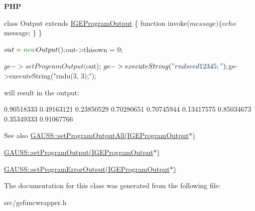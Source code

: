 {\bfseries P\+HP} 
\begin{DoxyCode}
\textcolor{keyword}{class }Output \textcolor{keyword}{extends} \hyperlink{class_i_g_e_program_output}{IGEProgramOutput} \{
    \textcolor{keyword}{function} invoke($message) \{
        echo $message;
    \}
\}

$out = \textcolor{keyword}{new} Output();
$out->thisown = 0;

$ge->setProgramOutput($out);
$ge->executeString(\textcolor{stringliteral}{"rndseed 12345;"});
$ge->executeString(\textcolor{stringliteral}{"rndu(3, 3);"});
\end{DoxyCode}


will result in the output\+: 
\begin{DoxyCode}
0.90518333       0.49163121       0.23850529
0.70280651       0.70745944       0.13417575
0.85034673       0.35349333       0.91067766
\end{DoxyCode}


\begin{DoxySeeAlso}{See also}
\hyperlink{class_g_a_u_s_s_a0b8379c48d677e05aeab433dba66fbb6}{G\+A\+U\+S\+S\+::set\+Program\+Output\+All(\+I\+G\+E\+Program\+Output$\ast$)} 

\hyperlink{class_g_a_u_s_s_a7f0dc6b5b307aa06c347f9c6a9fdacab}{G\+A\+U\+S\+S\+::set\+Program\+Output(\+I\+G\+E\+Program\+Output$\ast$)} 

\hyperlink{class_g_a_u_s_s_abd75266b2c4075da75163fe95b013ef3}{G\+A\+U\+S\+S\+::set\+Program\+Error\+Output(\+I\+G\+E\+Program\+Output$\ast$)} 
\end{DoxySeeAlso}


The documentation for this class was generated from the following file\+:\begin{DoxyCompactItemize}
\item 
src/gefuncwrapper.\+h\end{DoxyCompactItemize}
